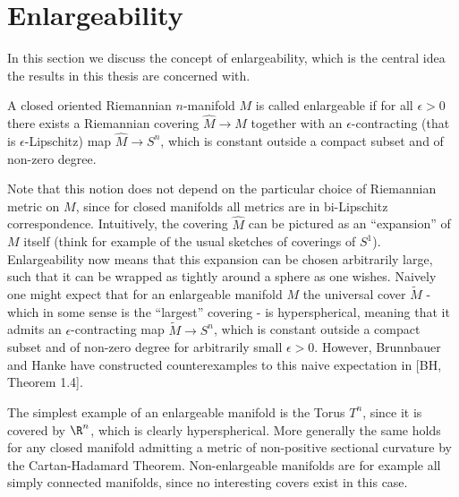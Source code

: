\section{Enlargeability}
\label{sec:enl}

In this section we discuss the concept of enlargeability, which is the central idea the results in this thesis are concerned with. 

\begin{definition}
    \label{enl:def:enlargeability}
    A closed oriented Riemannian $n$-manifold $M$ is called enlargeable if for all $\epsilon >0$ there exists a Riemannian covering $\hat{M} \to M$ together with an $\epsilon$-contracting (that is $\epsilon$-Lipschitz) map $\hat{M} \to S^n$, which is constant outside a compact subset and of non-zero degree.
\end{definition}

Note that this notion does not depend on the particular choice of Riemannian metric on $M$, since for closed manifolds all metrics are in bi-Lipschitz correspondence. Intuitively, the covering $\hat{M}$ can be pictured as an ``expansion'' of $M$ itself (think for example of the usual sketches of coverings of $S^1$). Enlargeability now means that this expansion can be chosen arbitrarily large, such that it can be wrapped as tightly around a sphere as one wishes. Naively one might expect that for an enlargeable manifold $M$ the universal cover $\tilde{M}$ - which in some sense is the ``largest'' covering - is hyperspherical, meaning that it admits an $\epsilon$-contracting map $\tilde{M} \to S^n$, which is constant outside a compact subset and of non-zero degree for arbitrarily small $\epsilon > 0$. However, Brunnbauer and Hanke have constructed counterexamples to this naive expectation in [BH, Theorem 1.4].

The simplest example of an enlargeable manifold is the Torus $T^n$, since it is covered by $\R^n$, which is clearly hyperspherical. More generally the same holds for any closed manifold admitting a metric of non-positive sectional curvature by the Cartan-Hadamard Theorem. Non-enlargeable manifolds are for example all simply connected manifolds, since no interesting covers exist in this case.



